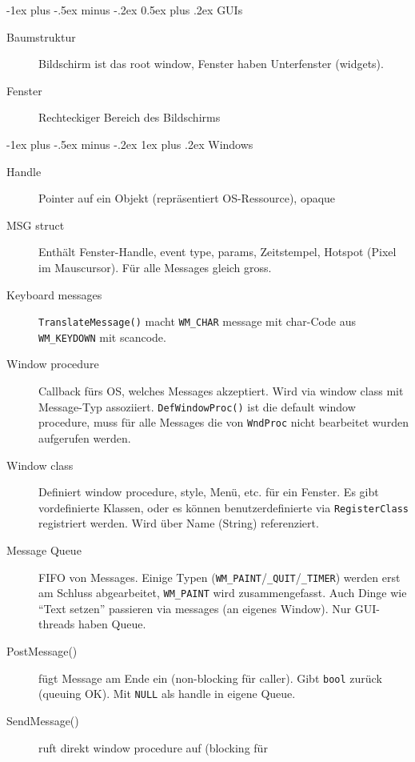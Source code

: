 \documentclass[10pt,landscape,a4paper]{article}
\makeatletter
\renewcommand{\section}{\@startsection{section}{1}{0mm}%
                                {-1ex plus -.5ex minus -.2ex}%
                                {0.5ex plus .2ex}%
                                {\normalfont\large\bfseries}}
\renewcommand{\subsubsection}{\@startsection{subsubsection}{3}{0mm}%
                                {-1ex plus -.5ex minus -.2ex}%
                                {1ex plus .2ex}%
                                {\normalfont\footnotesize\bfseries}}
\makeatother
\begin{document}
\begin{multicols*}{3}
\section{GUIs}

\begin{description}
  \item[Baumstruktur] Bildschirm ist das root window, Fenster haben Unterfenster (widgets).
  \item[Fenster] Rechteckiger Bereich des Bildschirms
\end{description}

\subsubsection{Windows}

\begin{description}
  \item[Handle] Pointer auf ein Objekt (repräsentiert OS-Ressource), opaque
  \item[MSG struct] Enthält Fenster-Handle, event type, params,
    Zeitstempel, Hotspot (Pixel im Mauscursor). Für alle Messages gleich gross.
  \item[Keyboard messages] \verb|TranslateMessage()| macht \verb|WM_CHAR|
    message mit char-Code aus \verb|WM_KEYDOWN| mit scancode.
  \item[Window procedure] Callback fürs OS, welches Messages akzeptiert. Wird
    via window class mit Message-Typ assoziiert. \verb|DefWindowProc()| ist die
    default window procedure, muss für alle Messages die von \verb|WndProc|
    nicht bearbeitet wurden aufgerufen werden.
  \item[Window class] Definiert window procedure, style, Menü, etc. für ein
    Fenster. Es gibt vordefinierte Klassen, oder es können benutzerdefinierte
    via \verb|RegisterClass| registriert werden. Wird über Name (String)
referenziert.
  \item[Message Queue] FIFO von Messages. Einige Typen
    (\verb|WM_PAINT|/\verb|_QUIT|/\verb|_TIMER|) werden erst am Schluss
    abgearbeitet, \verb|WM_PAINT| wird zusammengefasst. Auch Dinge wie ``Text
    setzen'' passieren via messages (an eigenes Window). Nur GUI-threads haben Queue.
   \item[PostMessage()] fügt Message am Ende ein (non-blocking für
     caller). Gibt \verb|bool| zurück (queuing OK). Mit \verb|NULL| als handle
     in eigene Queue.
   \item[SendMessage()] ruft direkt window procedure auf (blocking für

\end{description}
\end{multicols*}
\end{document}
